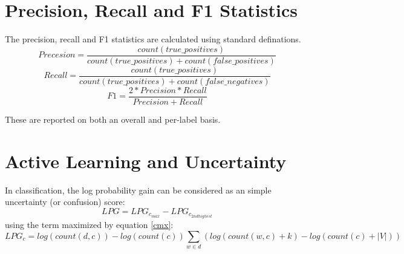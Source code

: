 \documentclass{article}
\begin{document}
\section{Precision, Recall and F1 Statistics}
The precision, recall and F1 statistics are calculated using standard definations.
\begin{equation}\label{precision}
Precesion = \frac{count(true\_positives)}{ count(true\_positives) + count(false\_positives)}
\end{equation}
\begin{equation}\label{recall}
Recall = \frac{count(true\_positives)}{ count(true\_positives) + count(false\_negatives)}
\end{equation}
\begin{equation}\label{F1}
F1 = \frac{2*Precision*Recall}{Precision+Recall} 
\end{equation}

These are reported on both an overall and per-label basis.
\section{Active Learning and Uncertainty}
In classification, the log probability gain can be considered as an simple uncertainty (or confusion) score:
\begin{equation}\label{lpg1}
LPG = LPG_{c_{max}} - LPG_{c_{2nd highest}}
\end{equation}
using the term maximized by equation \ref{cmx}:
\begin{equation}\label{lpg2}
LPG_{c} = log(count(d,c)) - log(count(c))  \sum_{w \in d} ( log(count(w,c)+k) - log(count(c) + |V|) )
\end{equation}
\end{document}
